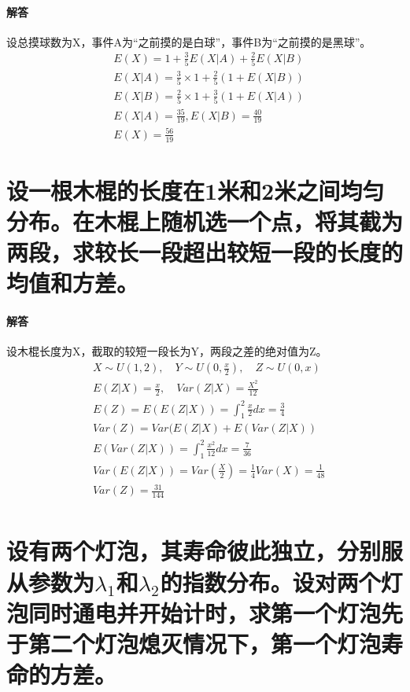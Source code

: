 \documentclass[UTF8]{ctexart}
\begin{document}
\paragraph{解答}
设总摸球数为X，事件A为“之前摸的是白球”，事件B为“之前摸的是黑球”。
\begin{equation*}
\begin{aligned}
&E(X)=1+\frac{3}{5}E(X\lvert A)+\frac{2}{5}E(X\lvert B)\\
&E(X\lvert A)=\frac{3}{5}\times 1+\frac{2}{5}(1+E(X\lvert B))\\
&E(X\lvert B)=\frac{2}{5}\times 1+\frac{3}{5}(1+E(X\lvert A))\\
&E(X\lvert A)=\frac{35}{19},E(X\lvert B)=\frac{40}{19}\\
&E(X)=\frac{56}{19}
\end{aligned}
\end{equation*}
\section{设一根木棍的长度在1米和2米之间均匀分布。在木棍上随机选一个点，将其截为两段，求较长一段超出较短一段的长度的均值和方差。}
\paragraph{解答}
设木棍长度为X，截取的较短一段长为Y，两段之差的绝对值为Z。
\begin{equation*}
\begin{aligned}
&X\sim U(1,2),\quad Y\sim U(0,\frac{x}{2}),\quad Z\sim U(0,x)\\
&E(Z\lvert X)=\frac{x}{2},\quad Var(Z\lvert X)=\frac{X^2}{12}\\
&E(Z)=E(E(Z\lvert X))=\int_1^2\frac{x}{2}dx=\frac{3}{4}\\
&Var(Z)=Var(E(Z\lvert X)+E(Var(Z\lvert X))\\
&E(Var(Z\lvert X))=\int_1^2\frac{x^2}{12}dx=\frac{7}{36}\\
&Var(E(Z\lvert X))=Var(\frac{X}{2})=\frac{1}{4}Var(X)=\frac{1}{48}\\
&Var(Z)=\frac{31}{144}\\
\end{aligned}
\end{equation*}
\section{设有两个灯泡，其寿命彼此独立，分别服从参数为$\lambda_1$和$\lambda_2$的指数分布。设对两个灯泡同时通电并开始计时，求第一个灯泡先于第二个灯泡熄灭情况下，第一个灯泡寿命的方差。}
\end{document}

